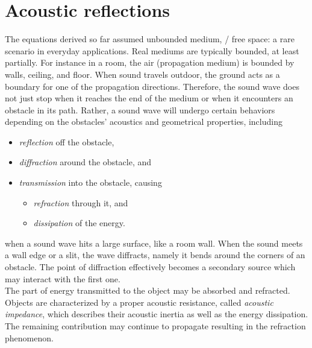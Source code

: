 \section{Acoustic reflections}\label{ch:acoustics:sec:reflection}
The equations derived so far assumed unbounded medium, \ie/ free space: a rare scenario in everyday applications.
Real mediums are typically bounded, at least partially.
For instance in a room, the air (propagation medium) is bounded by walls, ceiling, and floor.
When sound travels outdoor, the ground acts as a boundary for one of the propagation directions.
Therefore, the sound wave does not just stop when it reaches the end of the medium or when it encounters an obstacle in its path.
Rather, a sound wave will undergo certain behaviors depending on the obstacles' acoustics and geometrical properties, including
\begin{itemize}
    \item \textit{reflection} off the obstacle,
    \item \textit{diffraction} around the obstacle, and
    \item \textit{transmission} into the obstacle, causing
    \begin{itemize}
        \item \textit{refraction} through it, and
        \item \textit{dissipation} of the energy.
    \end{itemize}
\end{itemize}

 when a sound wave hits a large surface, like a room wall.
When the sound meets a wall edge or a slit, the wave diffracts, namely it bends around the corners of an obstacle.
The point of diffraction effectively becomes a secondary source which may interact with the first one.
\\The part of energy transmitted to the object may be absorbed and refracted.
Objects are characterized by a proper acoustic resistance, called \textit{acoustic impedance}, which
describes their acoustic inertia as well as the energy dissipation.
The remaining contribution may continue to propagate resulting in the refraction phenomenon.

